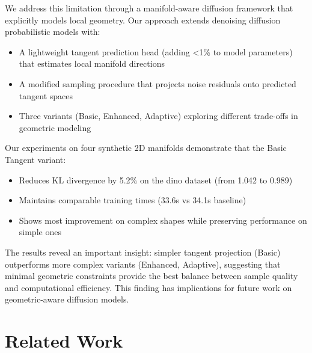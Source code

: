 \documentclass[final]{iclr2024_conference}
\begin{document}
We address this limitation through a manifold-aware diffusion framework that explicitly models local geometry. Our approach extends denoising diffusion probabilistic models with:
\begin{itemize}
    \item A lightweight tangent prediction head (adding <1\% to model parameters) that estimates local manifold directions
    \item A modified sampling procedure that projects noise residuals onto predicted tangent spaces
    \item Three variants (Basic, Enhanced, Adaptive) exploring different trade-offs in geometric modeling
\end{itemize}

Our experiments on four synthetic 2D manifolds demonstrate that the Basic Tangent variant:
\begin{itemize}
    \item Reduces KL divergence by 5.2\% on the dino dataset (from 1.042 to 0.989)
    \item Maintains comparable training times (33.6s vs 34.1s baseline)
    \item Shows most improvement on complex shapes while preserving performance on simple ones
\end{itemize}

The results reveal an important insight: simpler tangent projection (Basic) outperforms more complex variants (Enhanced, Adaptive), suggesting that minimal geometric constraints provide the best balance between sample quality and computational efficiency. This finding has implications for future work on geometric-aware diffusion models.

\section{Related Work}
\label{sec:related}




\end{document}
